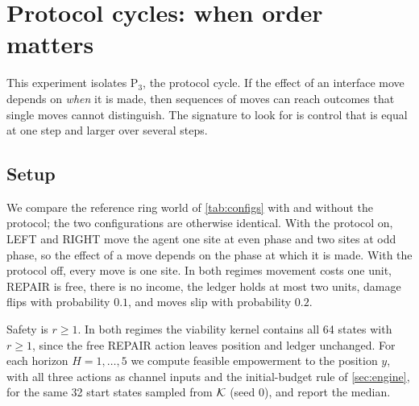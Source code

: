 \section{Protocol cycles: when order matters}
\label{sec:ex_holonomy}

This experiment isolates P$_3$, the protocol cycle. If the effect of an interface move depends on \emph{when} it is made, then sequences of moves can reach outcomes that single moves cannot distinguish. The signature to look for is control that is equal at one step and larger over several steps.

\subsection{Setup}
We compare the reference ring world of \cref{tab:configs} with and without the protocol; the two configurations are otherwise identical. With the protocol on, LEFT and RIGHT move the agent one site at even phase and two sites at odd phase, so the effect of a move depends on the phase at which it is made. With the protocol off, every move is one site. In both regimes movement costs one unit, REPAIR is free, there is no income, the ledger holds at most two units, damage flips with probability $0.1$, and moves slip with probability $0.2$.

Safety is $r\ge1$. In both regimes the viability kernel contains all 64 states with $r\ge 1$, since the free REPAIR action leaves position and ledger unchanged. For each horizon $H=1,\dots,5$ we compute feasible empowerment to the position $y$, with all three actions as channel inputs and the initial-budget rule of \cref{sec:engine}, for the same 32 start states sampled from $\mathcal{K}$ (seed $0$), and report the median.

